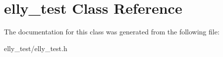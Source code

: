 \hypertarget{interfaceelly__test}{\section{elly\-\_\-test Class Reference}
\label{interfaceelly__test}
}


The documentation for this class was generated from the following file\-:\begin{DoxyCompactItemize}
\item 
elly\-\_\-test/elly\-\_\-test.\-h\end{DoxyCompactItemize}
